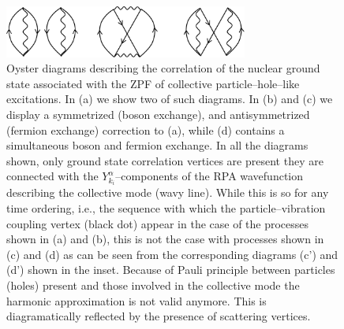 \begin{figure}
\centerline {
\includegraphics*[width=8cm]{introduccion/figs/figintroA1}
}
\caption{Oyster diagrams describing the correlation of the nuclear ground state associated with the ZPF of  collective particle--hole--like excitations. In (a) we show two of such diagrams. In (b) and (c) we display a symmetrized (boson exchange), and antisymmetrized  (fermion exchange) correction to (a), while  (d) contains a simultaneous boson and fermion exchange. In all the diagrams shown, only ground state correlation vertices are present they are connected with the $Y^\alpha_{k_i}$--components of the RPA wavefunction describing the collective mode (wavy line). While this is so for any time ordering, i.e., the sequence with which the particle--vibration coupling vertex (black dot) appear in the case of the processes shown in (a) and (b), this is not the case with processes shown in (c) and (d) as can be seen from the corresponding diagrams (c') and (d') shown in the inset. Because of Pauli principle between particles (holes) present and those involved in the collective mode the harmonic approximation is not valid anymore. This is diagramatically reflected by the presence of scattering vertices.}
\label{figintroA1}
\end{figure}
